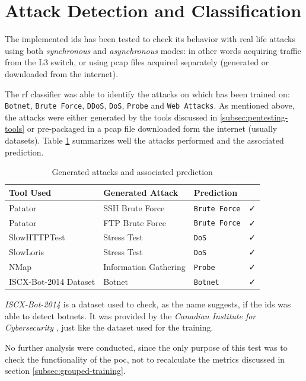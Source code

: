\section{Attack Detection and Classification}
\label{sec:attack-detection}

The implemented \gls{ids} has been tested to check its behavior with real life attacks using both \textit{synchronous} and \textit{asynchronous} modes: in other words acquiring traffic from the L3 switch, or using \gls{pcap} files acquired separately (generated or downloaded from the internet).
\par The \gls{rf} classifier was able to identify the attacks on which has been trained on: \texttt{Botnet}, \texttt{Brute Force}, \texttt{DDoS}, \texttt{DoS}, \texttt{Probe} and \texttt{Web Attacks}. As mentioned above, the attacks were either generated by the tools discussed in \ref{subsec:pentesting-tools} or pre-packaged in a \gls{pcap} file downloaded form the internet (usually datasets). Table \ref{tab:attack-predictions} summarizes well the attacks performed and the associated prediction.

\begin{table}[h!]
   \centering
   \begin{tabular}{l|lll}
       \toprule 
       Tool Used & Generated Attack & Prediction & \\
       \midrule
       \rowcolor{black!10} Patator & SSH Brute Force & \texttt{Brute Force} & \faCheck \\
       Patator & FTP Brute Force & \texttt{Brute Force} & \faCheck \\
       \rowcolor{black!10} SlowHTTPTest & Stress Test & \texttt{DoS} & \faCheck \\
       SlowLoris & Stress Test & \texttt{DoS} & \faCheck \\
       \rowcolor{black!10} NMap & Information Gathering & \texttt{Probe} & \faCheck \\
       ISCX-Bot-2014 Dataset & Botnet & \texttt{Botnet} & \faCheck \\
       \bottomrule
   \end{tabular}
   \caption{Generated attacks and associated prediction}
   \label{tab:attack-predictions}
\end{table}
\textit{ISCX-Bot-2014} is a dataset used to check, as the name suggests, if the \gls{ids} was able to detect botnets. It was provided by the \textit{Canadian Institute for Cybersecurity} \cite{Beigi2014}, just like the dataset used for the training.
\par No further analysis were conducted, since the only purpose of this test was to check the functionality of the \gls{poc}, not to recalculate the metrics discussed in section \ref{subsec:grouped-training}.